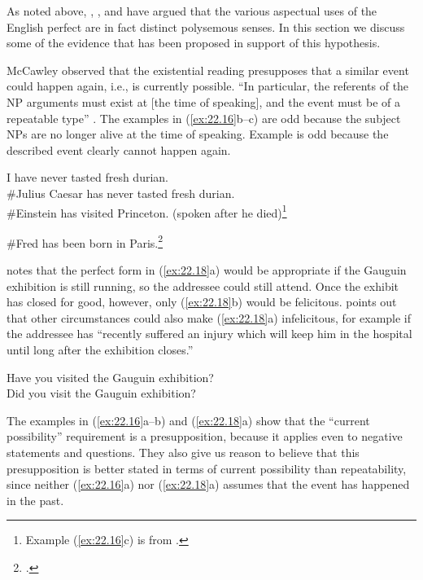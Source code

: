 As noted above, \citet{McCawley1971,McCawley1981b}, \citet{Michaelis1994,Michaelis1998}, and \citet{Kiparsky2002} have argued that the various aspectual uses of the English perfect are in fact distinct polysemous senses. In this section we discuss some of the evidence that has been proposed in support of this hypothesis.


McCawley observed that the existential reading presupposes that a similar event could happen again, i.e., is currently possible. “In particular, the referents of the NP arguments must exist at [the time of speaking], and the event must be of a repeatable type” \citep{Kiparsky2002}. The examples in (\ref{ex:22.16}b--c) are odd because the subject NPs are no longer alive at the time of speaking. Example  is odd because the described event clearly cannot happen again. 


\ea \label{ex:22.16}
\ea I have never tasted fresh durian.\\
\ex \#Julius Caesar has never tasted fresh durian.\\
\ex \#Einstein has visited Princeton. (spoken after he died)\footnote{Example (\ref{ex:22.16}c) is from \citet{Chomsky1970}.}
                       \z
\z

\ea \label{ex:22.17}
\#Fred has been born in Paris.\footnote{\citet{Kiparsky2002}.}
\z


\citet[33]{Leech1971} notes that the perfect form in (\ref{ex:22.18}a) would be appropriate if the Gauguin exhibition is still running, so the addressee could still attend. Once the exhibit has closed for good, however, only (\ref{ex:22.18}b) would be felicitous. \citet[107]{McCawley1971} points out that other circumstances could also make (\ref{ex:22.18}a) infelicitous, for example if the addressee has “recently suffered an injury which will keep him in the hospital until long after the exhibition closes.”


\ea \label{ex:22.18}
\ea Have you visited the Gauguin exhibition?\\
\ex Did you visit the Gauguin exhibition?
                       \z
\z


The examples in (\ref{ex:22.16}a--b) and (\ref{ex:22.18}a) show that the “current possibility” requirement is a presupposition, because it applies even to negative statements and questions. They also give us reason to believe that this presupposition is better stated in terms of current possibility than repeatability, since neither  (\ref{ex:22.16}a) nor (\ref{ex:22.18}a) assumes that the event has happened in the past.



